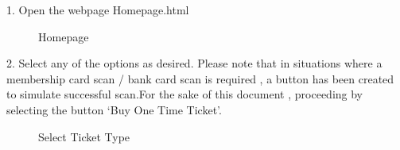 \documentclass[12pt]{report}
\begin{document}
1.	Open the webpage Homepage.html 
\begin{figure}[H]
	\caption{\label{fig:homepage}Homepage}	
\end{figure}


2.	Select any of the options as desired. Please note that in situations where a membership card scan / bank card scan is required , a button has been created to simulate successful scan.For the sake of this document , proceeding by selecting the button ‘Buy One Time Ticket’. \\
\begin{figure}[H]
	\caption{\label{fig:selectpass}Select Ticket Type}	
\end{figure}
\end{document}
